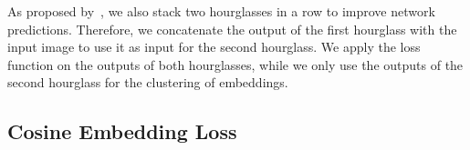 \documentclass[runningheads,a4paper]{llncs}
\newcommand{\christian}[1]{\textcolor{blue}{[#1]}}
\begin{document}
As proposed by~\cite{Newell2016}, we also stack two hourglasses in a row to improve network predictions.
Therefore, we concatenate the output of the first hourglass with the input image to use it as input for the second hourglass.
We apply the loss function on the outputs of both hourglasses, while we only use the outputs of the second hourglass for the clustering of embeddings.



\subsection{Cosine Embedding Loss}
\label{subsec:loss}


\newcommand{\setinst}{\mathbb{I}}
\newcommand{\setseg}{\mathbb{S}}
\newcommand{\setsegi}{\setseg^{(i)}}
\newcommand{\setsegj}{\setseg^{(j)}}
\newcommand{\setsegbac}{\setseg^{\textit{bac}}}
\newcommand{\neighseg}{\mathbb{N}}
\newcommand{\neighsegi}{\neighseg^{(i)}}
\newcommand{\neighsegbac}{\neighseg^{\textit{bac}}}
\newcommand{\emb}{\vec{e}}
\newcommand{\meanemb}{\vec{\bar{e}}}
\newcommand{\meanembi}{\meanemb^{(i)}}
\newcommand{\loss}{L}
\end{document}
